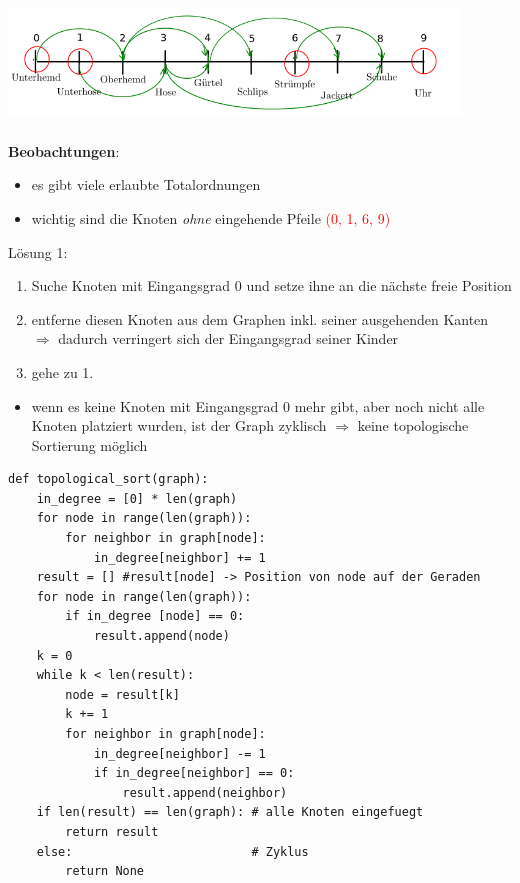    \includegraphics[width=12cm,height=4cm,keepaspectratio]{./Pictures/Zeitstrahl.png}\\

    \textbf{Beobachtungen}:
    \begin{itemize}
        \item es gibt viele erlaubte Totalordnungen
        \item wichtig sind die Knoten \emph{ohne} eingehende Pfeile \textcolor{red}{(0, 1, 6, 9)}
    \end{itemize}

    Lösung 1:
    \begin{enumerate}
        \item Suche Knoten mit Eingangsgrad 0 und setze ihne an die nächste freie Position
        \item entferne diesen Knoten aus dem Graphen inkl. seiner ausgehenden Kanten\\
        $\Rightarrow$ dadurch verringert sich der Eingangsgrad seiner Kinder
        \item gehe zu 1.
    \end{enumerate}
    \begin{itemize}[label={}]
        \item wenn es keine Knoten mit Eingangsgrad 0 mehr gibt, aber noch nicht alle Knoten platziert wurden, ist der Graph zyklisch $\Rightarrow$ keine topologische Sortierung möglich
    \end{itemize}


    \begin{verbatim}
def topological_sort(graph):
    in_degree = [0] * len(graph)
    for node in range(len(graph)):
        for neighbor in graph[node]:
            in_degree[neighbor] += 1
    result = [] #result[node] -> Position von node auf der Geraden
    for node in range(len(graph)):
        if in_degree [node] == 0:
            result.append(node)
    k = 0
    while k < len(result):
        node = result[k]
        k += 1
        for neighbor in graph[node]:
            in_degree[neighbor] -= 1
            if in_degree[neighbor] == 0:
                result.append(neighbor)
    if len(result) == len(graph): # alle Knoten eingefuegt
        return result
    else:                         # Zyklus
        return None
    \end{verbatim}


